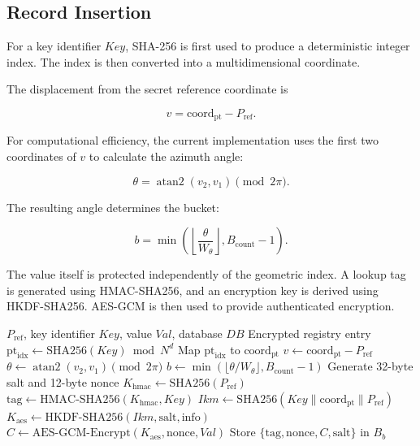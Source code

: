 \documentclass[journal,twocolumn]{IEEEtran}
\begin{document}
\subsection{Record Insertion}

For a key identifier $Key$, SHA-256 is first used to produce a deterministic integer index. The index is then converted into a multidimensional coordinate.

The displacement from the secret reference coordinate is

\begin{equation}
v=\mathrm{coord}_{\mathrm{pt}}-P_{\mathrm{ref}}.
\end{equation}

For computational efficiency, the current implementation uses the first two coordinates of $v$ to calculate the azimuth angle:

\begin{equation}
\theta=
\operatorname{atan2}(v_2,v_1)\pmod{2\pi}.
\end{equation}

The resulting angle determines the bucket:

\begin{equation}
b=
\min\left(
\left\lfloor\frac{\theta}{W_\theta}\right\rfloor,
B_{\mathrm{count}}-1
\right).
\end{equation}

The value itself is protected independently of the geometric index. A lookup tag is generated using HMAC-SHA256, and an encryption key is derived using HKDF-SHA256. AES-GCM is then used to provide authenticated encryption.

\begin{algorithm}[htbp]
\caption{ABLKM Record Insertion}
\label{alg:store}
\begin{algorithmic}[1]
\REQUIRE $P_{\mathrm{ref}}$, key identifier $Key$, value $Val$, database $DB$
\ENSURE Encrypted registry entry
\STATE $\mathrm{pt}_{\mathrm{idx}}\leftarrow\mathrm{SHA256}(Key)\bmod N^d$
\STATE Map $\mathrm{pt}_{\mathrm{idx}}$ to $\mathrm{coord}_{\mathrm{pt}}$
\STATE $v\leftarrow\mathrm{coord}_{\mathrm{pt}}-P_{\mathrm{ref}}$
\STATE $\theta\leftarrow\operatorname{atan2}(v_2,v_1)\pmod{2\pi}$
\STATE $b\leftarrow\min(\lfloor\theta/W_\theta\rfloor,B_{\mathrm{count}}-1)$
\STATE Generate 32-byte salt and 12-byte nonce
\STATE $K_{\mathrm{hmac}}\leftarrow\mathrm{SHA256}(P_{\mathrm{ref}})$
\STATE $\mathrm{tag}\leftarrow\mathrm{HMAC\text{-}SHA256}(K_{\mathrm{hmac}},Key)$
\STATE $Ikm\leftarrow\mathrm{SHA256}(Key\parallel\mathrm{coord}_{\mathrm{pt}}\parallel P_{\mathrm{ref}})$
\STATE $K_{\mathrm{aes}}\leftarrow\mathrm{HKDF\text{-}SHA256}(Ikm,\mathrm{salt},\mathrm{info})$
\STATE $C\leftarrow\mathrm{AES\text{-}GCM\text{-}Encrypt}(K_{\mathrm{aes}},\mathrm{nonce},Val)$
\STATE Store $\{\mathrm{tag},\mathrm{nonce},C,\mathrm{salt}\}$ in $B_b$
\end{algorithmic}
\end{algorithm}
\end{document}
